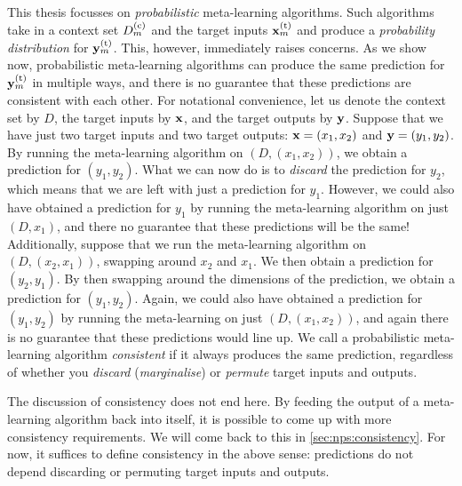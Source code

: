 \documentclass[12pt, twoside]{report}
\begin{document}
This thesis focusses on \emph{probabilistic} meta-learning algorithms. %
Such algorithms take in a context set $D_m\us{(c)}$ and the target inputs $\vx_m\us{(t)}$ and produce a \emph{probability distribution} for $\vy\us{(t)}_m$.
This, however, immediately raises concerns.
As we show now, probabilistic meta-learning algorithms can produce the same prediction for $\vy_m\us{(t)}$ in multiple ways,
and there is no guarantee that these predictions are consistent with each other.
For notational convenience, let us denote the context set by $D$, the target inputs by $\mathbf{x}$, and the target outputs by $\mathbf{y}$.
Suppose that we have just two target inputs and two target outputs: $\mathbf{x} = (x_1, x_2)$ and $\mathbf{y} = (y_1, y_2)$.
By running the meta-learning algorithm on $(D, (x_1, x_2))$, we obtain a prediction for $(y_1, y_2)$.
What we can now do is to \emph{discard} the prediction for $y_2$, which means that we are left with just a prediction for $y_1$.
However, we could also have obtained a prediction for $y_1$ by running the meta-learning algorithm on just $(D, x_1)$, and there no guarantee that these predictions will be the same!
Additionally, suppose that we run the meta-learning algorithm on $(D, (x_2, x_1))$, swapping around $x_2$ and $x_1$.
We then obtain a prediction for $(y_2, y_1)$.
By then swapping around the dimensions of the prediction, we obtain a prediction for $(y_1, y_2)$.
Again, we could also have obtained a prediction for $(y_1, y_2)$ by running the meta-learning on just $(D, (x_1, x_2))$, and again there is no guarantee that these predictions would line up.
We call a probabilistic meta-learning algorithm \emph{consistent} if it always produces the same prediction, regardless of whether you \emph{discard} (\emph{marginalise}) or \emph{permute} target inputs and outputs.

The discussion of consistency does not end here.
By feeding the output of a meta-learning algorithm back into itself, it is possible to come up with more consistency requirements.
We will come back to this in \cref{sec:nps:consistency}.
For now, it suffices to define consistency in the above sense:
predictions do not depend discarding or permuting target inputs and outputs.
\end{document}
